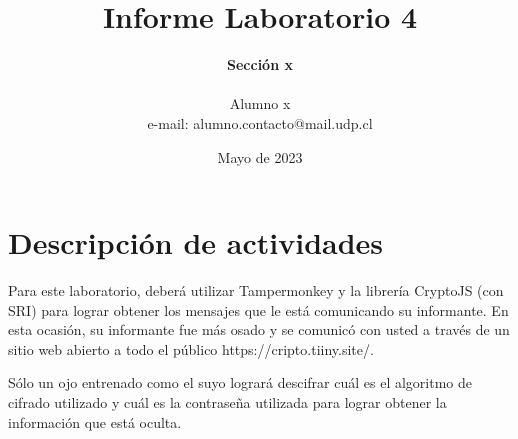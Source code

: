 \documentclass[letter,12pt]{article}
\begin{document}
%
   \title{\Huge{Informe Laboratorio 4}}

   \author{\textbf{Sección x} \\  \\Alumno x \\ e-mail: alumno.contacto@mail.udp.cl}
          
   \date{Mayo de 2023}

   \maketitle
   
   \tableofcontents
 
  \newpage
  

\section{Descripción de actividades}
Para este laboratorio, deberá utilizar Tampermonkey y la librería CryptoJS (con SRI) para lograr obtener los mensajes que le está comunicando su informante. En esta ocasión, su informante fue más osado y se comunicó con usted a través de un sitio web abierto a todo el público https://cripto.tiiny.site/.\par
Sólo un ojo entrenado como el suyo logrará descifrar cuál es el algoritmo de cifrado utilizado y cuál es la contraseña utilizada para lograr obtener la información que está oculta.
\end{document}
